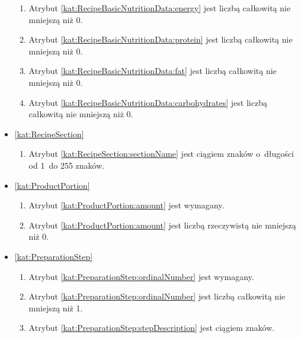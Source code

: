 \begin{itemize}[label={\textbf{Ograniczenia dla}}, wide, labelwidth=!, labelindent=0pt]
\begin{enumerate}[label={\textbf{OGR/3/\protect\twodigits{\arabic{enumi}}}}, wide, labelwidth=!, align=left, leftmargin=3cm, resume]
        \item Atrybut \ref{kat:RecipeBasicNutritionData:energy} jest liczbą całkowitą nie mniejszą niż 0.
        \item Atrybut \ref{kat:RecipeBasicNutritionData:protein} jest liczbą całkowitą nie mniejszą niż 0.
        \item Atrybut \ref{kat:RecipeBasicNutritionData:fat} jest liczbą całkowitą nie mniejszą niż 0.
        \item Atrybut \ref{kat:RecipeBasicNutritionData:carbohydrates} jest liczbą całkowitą nie mniejszą niż 0.
    \end{enumerate}

    \item\ref{kat:RecipeSection}\mynobreakpar
    \begin{enumerate}[label={\textbf{OGR/3/\protect\twodigits{\arabic{enumi}}}}, wide, labelwidth=!, align=left, leftmargin=3cm, resume]
        \item Atrybut \ref{kat:RecipeSection:sectionName} jest ciągiem znaków o~długości od 1~do 255 znaków.
    \end{enumerate}

    \item\ref{kat:ProductPortion}\mynobreakpar
    \begin{enumerate}[label={\textbf{OGR/3/\protect\twodigits{\arabic{enumi}}}}, wide, labelwidth=!, align=left, leftmargin=3cm, resume]
        \item Atrybut \ref{kat:ProductPortion:amount} jest wymagany.

        \item Atrybut \ref{kat:ProductPortion:amount} jest liczbą rzeczywistą nie mniejszą niż 0.
    \end{enumerate}

    \item\ref{kat:PreparationStep}\mynobreakpar
    \begin{enumerate}[label={\textbf{OGR/3/\protect\twodigits{\arabic{enumi}}}}, wide, labelwidth=!, align=left, leftmargin=3cm, resume]
        \item Atrybut \ref{kat:PreparationStep:ordinalNumber} jest wymagany.

        \item Atrybut \ref{kat:PreparationStep:ordinalNumber} jest liczbą całkowitą nie mniejszą niż 1.
        \item Atrybut \ref{kat:PreparationStep:stepDescription} jest ciągiem znaków.
    \end{enumerate}


\end{itemize}
